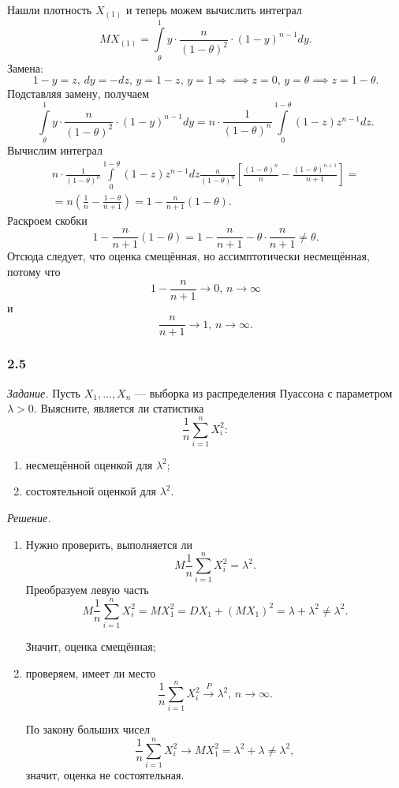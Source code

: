 Нашли плотность $X_{ \left( 1 \right) }$ и теперь можем вычислить интеграл
$$MX_{ \left( 1 \right) } =
  \int \limits_{ \theta }^1
    y \cdot \frac{n}{ \left( 1 - \theta \right)^2} \cdot \left( 1 - y \right)^{n - 1}
  dy.$$
Замена:
$$1 - y = z, \,
  dy = -dz, \,
  y = 1 - z, \,
  y = 1 \Rightarrow \implies z = 0, \,
  y = \theta \implies z = 1 - \theta.$$
Подставляя замену, получаем
$$ \int \limits_{ \theta }^1
    y \cdot \frac{n}{ \left( 1 - \theta \right)^2} \cdot \left( 1 - y \right)^{n - 1}
  dy =
  n \cdot \frac{1}{ \left( 1 - \theta \right)^n}
  \int \limits_0^{1 - \theta } \left( 1 - z \right) z^{n - 1} dz.$$
Вычислим интеграл
\begin{equation*}
  \begin{split}
    n \cdot \frac{1}{ \left( 1 - \theta \right)^n}
    \int \limits_0^{1 - \theta } \left( 1 - z \right) z^{n - 1} dz
    \frac{n}{ \left( 1 - \theta \right)^n}
    \left[
      \frac{ \left( 1 - \theta \right)^n}{n} - \frac{ \left( 1 - \theta \right)^{n+1}}{n + 1}
    \right] = \\
    = n \left( \frac{1}{n} - \frac{1 - \theta }{n + 1} \right) =
    1 - \frac{n}{n + 1} \left( 1 - \theta \right).
  \end{split}
\end{equation*}
Раскроем скобки
$$1 - \frac{n}{n + 1} \left( 1 - \theta \right) =
  1 - \frac{n}{n + 1} - \theta \cdot \frac{n}{n + 1} \neq
  \theta.$$
Отсюда следует, что оценка смещённая, но ассимптотически несмещённая, потому что
$$1 - \frac{n}{n + 1} \to 0, \,
  n \to \infty $$
и
$$ \frac{n}{n + 1} \to 1, \,
  n \to \infty.$$

\subsubsection*{2.5}

\textit{Задание.}
Пусть $X_1, \dotsc, X_n$ --- выборка из распределения Пуассона с параметром $ \lambda > 0$.
Выясните, является ли статистика
$$ \frac{1}{n} \sum \limits_{i = 1}^n X_i^2:$$
\begin{enumerate}[label=\alph*)]
  \item несмещённой оценкой для $ \lambda^2$;
  \item состоятельной оценкой для $ \lambda^2$.
\end{enumerate}

\textit{Решение.}
\begin{enumerate}[label=\alph*)]
  \item Нужно проверить, выполняется ли
  $$M \frac{1}{n} \sum \limits_{i = 1}^n X_i^2 =
    \lambda^2.$$
  Преобразуем левую часть
  $$M \frac{1}{n} \sum \limits_{i = 1}^n X_i^2 =
    MX_1^2 =
    DX_1 + \left( MX_1 \right)^2 =
    \lambda + \lambda^2 \neq
    \lambda^2.$$

  Значит, оценка смещённая;
  \item проверяем, имеет ли место
  $$ \frac{1}{n} \sum \limits_{i = 1}^n X_i^2  \overset{P}{ \rightarrow } \lambda^2, \,
    n \to \infty.$$

  По закону больших чисел
  $$ \frac{1}{n} \sum \limits_{i = 1}^n X_i^2 \to
    MX_1^2 =
    \lambda^2 + \lambda \neq
    \lambda^2,$$
  значит, оценка не состоятельная.
\end{enumerate}

